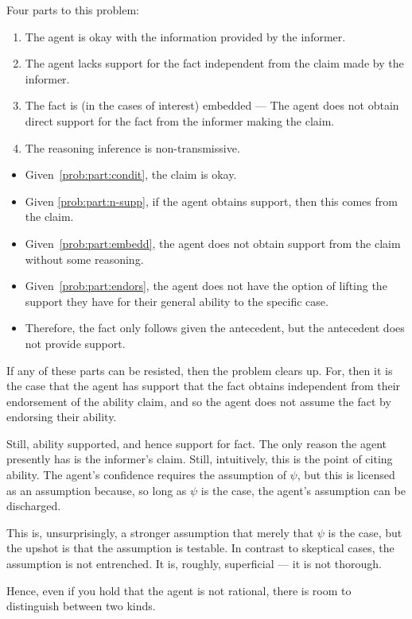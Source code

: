 \documentclass[10pt]{article}
\begin{document}
Four parts to this problem:
\begin{enumerate}[label=?\alph*., ref=(?\alph*)]
\item\label{prob:part:condit} The agent is okay with the information provided by the informer.
\item\label{prob:part:n-supp} The agent lacks support for the fact independent from the claim made by the informer.
\item\label{prob:part:embedd} The fact is (in the cases of interest) embedded --- The agent does not obtain direct support for the fact from the informer making the claim.
\item\label{prob:part:endors} The reasoning inference is non-transmissive.
\end{enumerate}

\begin{itemize}
\item Given~\ref{prob:part:condit}, the claim is okay.
\item Given \ref{prob:part:n-supp}, if the agent obtains support, then this comes from the claim.
\item Given~\ref{prob:part:embedd}, the agent does not obtain support from the claim without some reasoning.
\item Given~\ref{prob:part:endors}, the agent does not have the option of lifting the support they have for their general ability to the specific case.
\item Therefore, the fact only follows given the antecedent, but the antecedent does not provide support.
\end{itemize}

If any of these parts can be resisted, then the problem clears up.
For, then it is the case that the agent has support that the fact obtains independent from their endorsement of the ability claim, and so the agent does not assume the fact by endorsing their ability.

{
  \color{red}
  Still, ability supported, and hence support for fact.
  The only reason the agent presently has is the informer's claim.
  Still, intuitively, this is the point of citing ability.
  The agent's confidence requires the assumption of \(\psi\), but this is licensed as an assumption because, so long as \(\psi\) is the case, the agent's assumption can be discharged.

  This is, unsurprisingly, a stronger assumption that merely that \(\psi\) is the case, but the upshot is that the assumption is testable.
  In contrast to skeptical cases, the assumption is not entrenched.
  It is, roughly, superficial --- it is not thorough.

  Hence, even if you hold that the agent is not rational, there is room to distinguish between two kinds.
}
\end{document}

